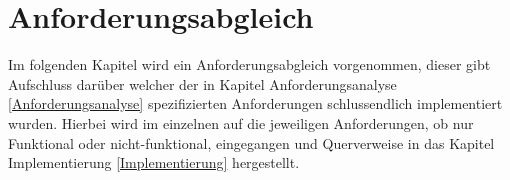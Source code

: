 \chapter{Anforderungsabgleich} \label{Anwendungsfälle}
Im folgenden Kapitel wird ein Anforderungsabgleich vorgenommen, dieser gibt Aufschluss darüber welcher der in Kapitel Anforderungsanalyse \ref{Anforderungsanalyse} spezifizierten Anforderungen schlussendlich implementiert wurden.
Hierbei wird im einzelnen auf die jeweiligen Anforderungen, ob nur Funktional oder nicht-funktional, eingegangen und Querverweise in das Kapitel Implementierung \ref{Implementierung} hergestellt.


